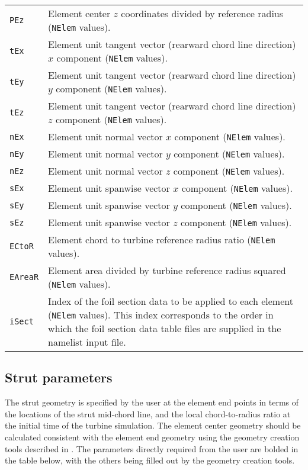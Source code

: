 \begin{longtable}{p{}p{}}
\texttt{PEz}     & Element center $z$ coordinates divided by reference radius (\texttt{NElem} values). \\
\texttt{tEx}     & Element unit tangent vector (rearward chord line direction) $x$ component (\texttt{NElem} values). \\
\texttt{tEy}     & Element unit tangent vector (rearward chord line direction) $y$ component (\texttt{NElem} values). \\
\texttt{tEz}     & Element unit tangent vector (rearward chord line direction) $z$ component (\texttt{NElem} values). \\
\texttt{nEx}     & Element unit normal vector $x$ component (\texttt{NElem} values). \\
\texttt{nEy}     & Element unit normal vector $y$ component (\texttt{NElem} values). \\
\texttt{nEz}     & Element unit normal vector $z$ component (\texttt{NElem} values). \\
\texttt{sEx}     & Element unit spanwise vector $x$ component (\texttt{NElem} values). \\
\texttt{sEy}     & Element unit spanwise vector $y$ component (\texttt{NElem} values). \\
\texttt{sEz}     & Element unit spanwise vector $z$ component (\texttt{NElem} values). \\
\texttt{ECtoR}   & Element chord to turbine reference radius ratio (\texttt{NElem}  values). \\
\texttt{EAreaR}  & Element area divided by turbine reference radius squared (\texttt{NElem} values). \\
\texttt{iSect}   & Index of the foil section data to be applied to each element (\texttt{NElem} values). This index corresponds to the order in which the foil section data table files are supplied in the namelist input file. \\ \bottomrule
 
\end{longtable}

\subsection{Strut parameters}
The strut geometry is specified by the user at the element end points in terms of the locations of the strut mid-chord line, and the local chord-to-radius ratio at the initial time of the turbine simulation. The element center geometry should be calculated consistent with the element end geometry using the geometry creation tools described in . The parameters directly required from the user are bolded in the table below, with the others being filled out by the geometry creation tools.


